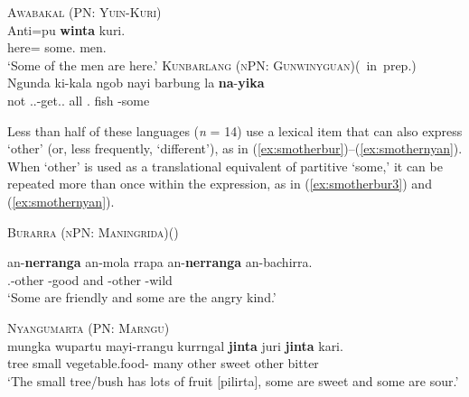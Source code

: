 \documentclass[12pt,egregdoesnotlikesansseriftitles]{scrartcl}
\begin{document}
\begin{exe}
  \ex\label{ex:specsmawa} \textsc{Awabakal (PN: Yuin-Kuri)}\hfill {}\\
  \gll Anti=pu \textbf{winta} kuri.\\
  here=\Excl{} some.\Abs{} men.\Abs\\
  \glt `Some of the men are here.' %
  \ex\label{ex:specsmwlg} \textsc{Kunbarlang (nPN: Gunwinyguan)}\hfill (\citeauthor{ikthesis}~in~prep.)\\
  {\gll Ngunda ki-kala ngob nayi barbung la \textbf{na}-\textbf{yika}\\
  not \Tsg.\Irr.\Pst-get.\Irr.\Pst{} all \Nm.\Cli{} fish \Conj{} \Cli-some\\}
\end{exe}

Less than half of these languages (\textit{n} = 14) use a lexical item that can also express `other' (or, less frequently, `different'),  as in (\ref{ex:smotherbur})--(\ref{ex:smothernyan}). When `other' is used as a translational equivalent of partitive `some,' it can be repeated more than once within the expression, as in (\ref{ex:smotherbur3}) and (\ref{ex:smothernyan}).
\begin{exe}
  \ex\label{ex:smotherbur} \textsc{Burarra (nPN: Maningrida)}\hfill (\citealt{green87})
  \begin{xlist}
    \ex \gll an-\textbf{nerranga} an-mola  rrapa  an-\textbf{nerranga}  an-bachirra.\\
    \Third.\Min-other \Third\Min-good and \Third\Min-other \Third\Min-wild\\
    \glt `Some are friendly and some are the angry kind.' \label{ex:smotherbur3}
  \end{xlist}
  \ex\label{ex:smothernyan} \textsc{Nyangumarta (PN: Marngu)}\hfill {}\\
  \gll mungka wupartu mayi-rrangu kurrngal \textbf{jinta} juri \textbf{jinta} kari.\\
  tree  small vegetable.food-\Pl{} many other sweet other bitter\\
  \glt `The small tree/bush has lots of fruit [pilirta], some are sweet and some are sour.'
\end{exe}
\end{document}

